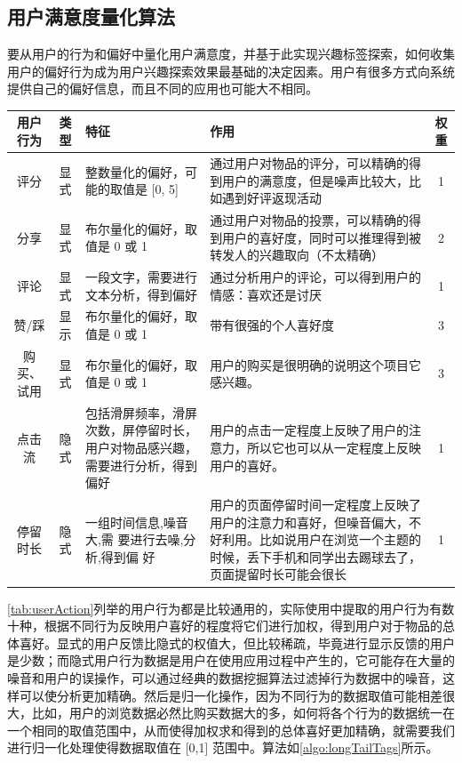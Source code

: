   \subsection{用户满意度量化算法}
  要从用户的行为和偏好中量化用户满意度，并基于此实现兴趣标签探索，如何收集用户的偏好行为成为用户兴趣探索效果最基础的决定因素。用户有很多方式向系统提供自己的偏好信息，而且不同的应用也可能大不相同。
    \begin{table}[htp]
    \centering
    \label{tab:userAction}
    \begin{tabular}{ |c|c|p{4cm}|p{5cm}|c|} \hline
     用户行为 & 类型 & 特征 & 作用 & 权重\\ \hline
     评分 & 显式 & 整数量化的偏好，可能的取值是 [0, 5] & 通过用户对物品的评分，可以精确的得到用户的满意度，但是噪声比较大，比如遇到好评返现活动 & 1\\ \hline
     分享 & 显式 & 布尔量化的偏好，取值是 0 或 1 & 通过用户对物品的投票，可以精确的得到用户的喜好度，同时可以推理得到被转发人的兴趣取向（不太精确）& 2\\ \hline
     评论 & 显式 & 一段文字，需要进行文本分析，得到偏好 & 通过分析用户的评论，可以得到用户的情感：喜欢还是讨厌 & 1\\ \hline
     赞/踩 & 显示 & 布尔量化的偏好，取值是 0 或 1 & 带有很强的个人喜好度 & 3 \\ \hline
     购买、试用 & 显式 & 布尔量化的偏好，取值是 0 或 1 & 用户的购买是很明确的说明这个项目它感兴趣。& 3 \\ \hline
     点击流 & 隐式 & 包括滑屏频率，滑屏次数，屏停留时长，用户对物品感兴趣，需要进行分析，得到偏好 & 用户的点击一定程度上反映了用户的注意力，所以它也可以从一定程度上反映用户的喜好。& 1 \\ \hline
     停留时长 & 隐式 & 一组时间信息,噪音大,需 要进行去噪,分析,得到偏 好 & 用户的页面停留时间一定程度上反映了用户的注意力和喜好，但噪音偏大，不好利用。比如说用户在浏览一个主题的时候，丢下手机和同学出去踢球去了，页面提留时长可能会很长 & 1 \\ \hline
    \end{tabular}
    \end{table}
  \autoref{tab:userAction}列举的用户行为都是比较通用的，实际使用中提取的用户行为有数十种，根据不同行为反映用户喜好的程度将它们进行加权，得到用户对于物品的总体喜好。显式的用户反馈比隐式的权值大，但比较稀疏，毕竟进行显示反馈的用户是少数；而隐式用户行为数据是用户在使用应用过程中产生的，它可能存在大量的噪音和用户的误操作，可以通过经典的数据挖掘算法过滤掉行为数据中的噪音，这样可以使分析更加精确。然后是归一化操作，因为不同行为的数据取值可能相差很大，比如，用户的浏览数据必然比购买数据大的多，如何将各个行为的数据统一在一个相同的取值范围中，从而使得加权求和得到的总体喜好更加精确，就需要我们进行归一化处理使得数据取值在 [0,1] 范围中。算法如\autoref{algo:longTailTags}所示。

